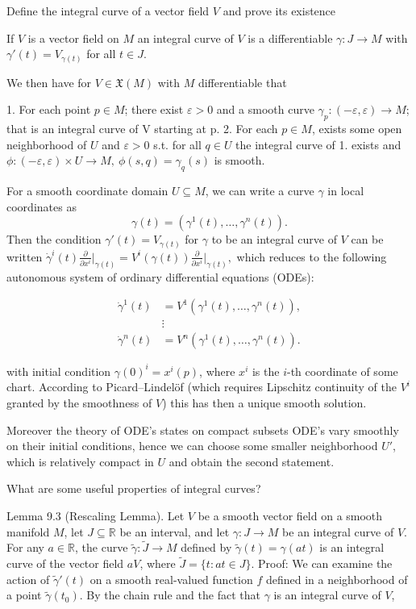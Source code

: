Define the integral curve of a vector field \( V \)
and prove its existence

If \( V \) is a vector field on \( M \) an integral curve of \( V \)
is a differentiable \( \gamma : J \to M \) with \( \gamma'(t) = V_{\gamma(t)} \)
for all \( t \in J \).

We then have for \( V \in \mathfrak{X}(M) \) with \( M \) differentiable
that

1. For each point \( p \in M \); there exist \( \varepsilon > 0 \) and a smooth curve \( \gamma_p : (-\varepsilon, \varepsilon) \to M \); 
that is an integral curve of V starting at p.
2. For each \( p \in M \), exists some open neighborhood of \( U \) and \( \varepsilon > 0 \)
s.t. for all \(q \in U\) the integral curve of 1. exists and 
\( \phi : (-\varepsilon, \varepsilon) \times U \to M, \ \phi(s,q) = \gamma_q(s) \) 
is smooth.

For a smooth coordinate domain \(U \subseteq M\), we can write a curve \(\gamma\) in local coordinates as
\[\gamma(t) = (\gamma^1(t), \dots, \gamma^n(t)).\] 
Then the condition \(\gamma'(t) = V_{\gamma(t)}\) for \(\gamma\) to be an integral curve of \(V\) can be written
\(\dot{\gamma}^i(t) \frac{\partial}{\partial x^i} \bigg|_{\gamma(t)} = V^i(\gamma(t)) \frac{\partial}{\partial x^i} \bigg|_{\gamma(t)},\)
which reduces to the following autonomous system of ordinary differential equations (ODEs):

\begin{align*}
\dot{\gamma}^1(t) &= V^1(\gamma^1(t), \dots, \gamma^n(t)), \\
&\vdots \\
\dot{\gamma}^n(t) &= V^n(\gamma^1(t), \dots, \gamma^n(t)). \tag{9.1}
\end{align*}

with initial condition \( \gamma(0)^i = x^i(p) \), where \( x^i \) is the \( i \)-th coordinate of some chart.
According to Picard–Lindelöf (which requires Lipschitz continuity of the \( V^i \) granted by the smoothness of \( V \))
this has then a unique smooth solution.

Moreover the theory of ODE's states on compact subsets ODE's vary smoothly on their initial conditions, hence
we can choose some smaller neighborhood \( U' \), which is relatively compact in \( U \) and obtain the second statement.


What are some useful properties of integral curves?

Lemma 9.3 (Rescaling Lemma). 
Let \(V\) be a smooth vector field on a smooth manifold \(M\), let \(J \subseteq \mathbb{R}\) be an interval, 
and let \(\gamma: J \to M\) be an integral curve of \(V\). 
For any \(a \in \mathbb{R}\), the curve \(\tilde{\gamma}: \tilde{J} \to M\) defined by \(\tilde{\gamma}(t) = \gamma(at)\) 
is an integral curve of the vector field \(aV\), where \(\tilde{J} = \{t: at \in J\}\).
Proof:
We can examine the action of \(\tilde{\gamma}'(t)\)
on a smooth real-valued function \(f\) defined in a neighborhood of a point \(\tilde{\gamma}(t_0)\). By
the chain rule and the fact that \(\gamma\) is an integral curve of \(V\),

